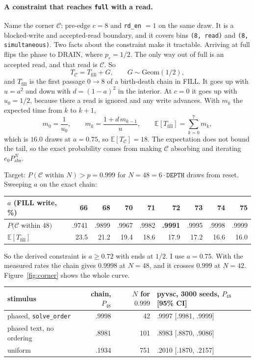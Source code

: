 \documentclass[11pt]{article}
\begin{document}
\paragraph{A constraint that reaches \texttt{full} with a read.}
Name the corner $\mathcal{C}$: pre-edge $c = 8$ and \texttt{rd\_en} $= 1$ on the
same draw. It is a blocked-write and accepted-read boundary, and it covers bins
\texttt{(8, read)} and \texttt{(8, simultaneous)}. Two facts about the
constraint make it tractable. Arriving at full flips the phase to DRAIN, where
$p_r = 1/2$. The only way out of full is an accepted read, and that read is
$\mathcal{C}$. So
\[
T_{\mathcal{C}} = T_{\text{fill}} + G, \qquad G \sim \mathrm{Geom}(1/2),
\]
and $T_{\text{fill}}$ is the first passage $0 \to 8$ of a birth-death chain in
FILL. It goes up with $u = a^2$ and down with $d = (1-a)^2$ in the interior.
At $c = 0$ it goes up with $u_0 = 1/2$, because there a read is ignored and
any write advances. With $m_k$ the expected time from $k$ to $k+1$,
\[
m_0 = \frac{1}{u_0}, \qquad m_k = \frac{1 + d\, m_{k-1}}{u}, \qquad
\mathbb{E}[T_{\text{fill}}] = \sum_{k=0}^{7} m_k ,
\]
which is $16.0$ draws at $a = 0.75$, so $\mathbb{E}[T_{\mathcal{C}}] = 18$.
The expectation does not bound the tail, so the exact probability comes from
making $\mathcal{C}$ absorbing and iterating $e_0 P_{\text{abs}}^N$.

Target: $P(\mathcal{C} \text{ within } N) > p = 0.999$ for $N = 48 = 6 \cdot
\texttt{DEPTH}$ draws from reset. Sweeping $a$ on the exact chain:

\begin{table}[h]
\centering
\begin{tabular}{@{}lrrrrrrrr@{}}
\toprule
$a$ (FILL write, \%) & 66 & 68 & 70 & 71 & \textbf{72} & 73 & 74 & 75 \\
\midrule
$P(\mathcal{C}$ within 48$)$ & .9741 & .9899 & .9967 & .9982 & \textbf{.9991} & .9995 & .9998 & .9999 \\
$\mathbb{E}[T_{\text{fill}}]$ & 23.5 & 21.2 & 19.4 & 18.6 & 17.9 & 17.2 & 16.6 & 16.0 \\
\bottomrule
\end{tabular}
\end{table}

\noindent
So the derived constraint is $a \geq 0.72$ with ends at $1/2$. I use
$a = 0.75$. With the measured rates the chain gives $0.9998$ at $N = 48$, and
it crosses $0.999$ at $N = 42$. Figure~\ref{fig:corner} shows the whole curve.

\begin{table}[h]
\centering
\begin{tabular}{@{}lrrl@{}}
\toprule
\textbf{stimulus} & chain, $P_{48}$ & $N$ for $0.999$ & pyvsc, 3000 seeds, $P_{48}$ [95\% CI] \\
\midrule
phased, \texttt{solve\_order}  & .9998 & 42  & .9997 [.9981, .9999] \\
phased text, no ordering       & .8981 & 101 & .8983 [.8870, .9086] \\
uniform                        & .1934 & 751 & .2010 [.1870, .2157] \\
\bottomrule
\end{tabular}
\end{table}
\end{document}
